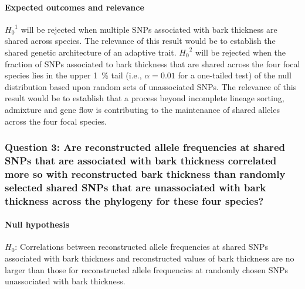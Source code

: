 \paragraph{Expected outcomes and relevance} ${H_{0}}^1$ will be rejected when multiple SNPs associated 
with bark thickness are shared across species. The relevance of this result would be to establish the shared genetic 
architecture of an adaptive trait. ${H_{0}}^2$ will be rejected when the fraction of SNPs associated to bark thickness that are 
shared across the four focal species lies in the upper \SI{1}{\percent} tail (i.e., $\alpha = 0.01$ for a one-tailed test) 
of the null distribution based upon random sets of unassociated SNPs. The relevance of this result would be to 
establish that a process beyond incomplete lineage sorting, admixture and gene flow is contributing to the 
maintenance of shared alleles across the four focal species. 

\subsubsection*{Question 3: Are reconstructed allele frequencies at shared SNPs that are associated with bark thickness 
correlated more so with reconstructed bark thickness than randomly selected shared SNPs that are unassociated with bark 
thickness across the phylogeny for these four species?}

\paragraph{Null hypothesis} $H_0$: Correlations between reconstructed allele frequencies at shared SNPs associated with 
bark thickness and reconstructed values of bark thickness are no larger than those for reconstructed allele frequencies at 
randomly chosen SNPs unassociated with bark thickness.

